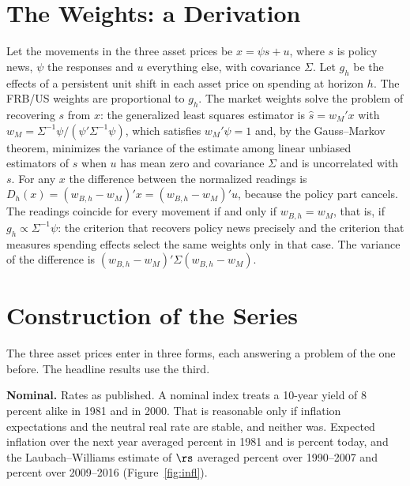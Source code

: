 \begin{appendices}
\renewcommand{\thetable}{\Alph{section}\arabic{table}}
\renewcommand{\thefigure}{\Alph{section}\arabic{figure}}
\FloatBarrier

\section{The Weights: a Derivation}\label{app:ma}
Let the movements in the three asset prices be $x=\psi s+u$, where $s$ is policy news, $\psi$ the responses and $u$ everything else, with covariance $\Sigma$. Let $g_h$ be the effects of a persistent unit shift in each asset price on spending at horizon $h$. The FRB/US weights are proportional to $g_h$. The market weights solve the problem of recovering $s$ from $x$: the generalized least squares estimator is $\hat s=w_M'x$ with $w_M=\Sigma^{-1}\psi/(\psi'\Sigma^{-1}\psi)$, which satisfies $w_M'\psi=1$ and, by the Gauss--Markov theorem, minimizes the variance of the estimate among linear unbiased estimators of $s$ when $u$ has mean zero and covariance $\Sigma$ and is uncorrelated with $s$. For any $x$ the difference between the normalized readings is $D_h(x)=(w_{B,h}-w_M)'x=(w_{B,h}-w_M)'u$, because the policy part cancels. The readings coincide for every movement if and only if $w_{B,h}=w_M$, that is, if $g_h\propto\Sigma^{-1}\psi$: the criterion that recovers policy news precisely and the criterion that measures spending effects select the same weights only in that case. The variance of the difference is $(w_{B,h}-w_M)'\Sigma(w_{B,h}-w_M)$.


\section{Construction of the Series}\label{app:steps}
The three asset prices enter in three forms, each answering a problem of the one before. The headline results use the third.

\textbf{Nominal.} Rates as published. A nominal index treats a 10-year yield of 8 percent alike in 1981 and in 2000. That is reasonable only if inflation expectations and the neutral real rate are stable, and neither was. Expected inflation over the next year averaged  percent in 1981 and is  percent today, and the Laubach--Williams estimate of $\rs$ averaged  percent over 1990--2007 and  percent over 2009--2016 (Figure~\ref{fig:infl}).


\end{appendices}
